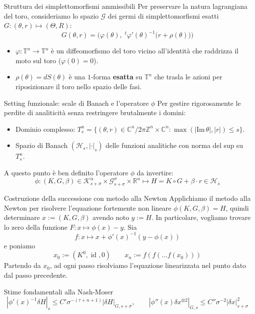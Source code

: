 \documentclass[10pt,aspectratio=169]{beamer}
\newcommand{\T}{\mathbb{T}}
\newcommand{\R}{\mathbb{R}}
\newcommand{\C}{\mathbb{C}}
\newcommand{\Z}{\mathbb{Z}}
\begin{document}
\begin{frame}{Struttura dei simplettomorfismi ammissibili}
  Per preservare la natura lagrangiana del toro, consideriamo lo spazio $\mathcal{G}$ dei germi di simplettomorfismi esatti $G: (\theta, r) \mapsto (\Theta, R)$:
  \[
    G(\theta, r) = \Big(\varphi(\theta), \; {}^t\varphi'(\theta)^{-1}\big(r + \rho(\theta)\big)\Big)
  \]
  \begin{itemize}
    \item $\varphi : \T^n \to \T^n$ è un diffeomorfismo del toro vicino all'identità che raddrizza il moto sul toro ($\varphi(0) = 0$).
    \item $\rho(\theta) = dS(\theta)$ è una $1$-forma \textbf{esatta} su $\T^n$ che trasla le azioni per riposizionare il toro nello spazio delle fasi.
  \end{itemize}
\end{frame}

\begin{frame}{Setting funzionale: scale di Banach e l'operatore $\phi$}
  Per gestire rigorosamente le perdite di analiticità senza restringere brutalmente i domini:
  \begin{itemize}
    \item Dominio complesso: $T^n_s = \{(\theta, r) \in \C^n/2\pi\Z^n \times \C^n : \max(|\mathrm{Im}\,\theta|, |r|) \le s\}$.
    \item Spazio di Banach $(\mathcal{H}_s, |\cdot|_s)$ delle funzioni analitiche con norma del sup su $T^n_s$.
  \end{itemize}
A questo punto è ben definito l'operatore $\phi$ da invertire:
    \[
      \phi : (K, G, \beta) \in \mathcal{K}^\alpha_{s+\sigma} \times \mathcal{G}_{s+\sigma}^\sigma \times \R^n \longmapsto H = K \circ G + \beta \cdot r \in \mathcal{H}_s
    \]
\end{frame}

\begin{frame}{Costruzione della successione con metodo alla Newton}
  Applichiamo il metodo alla Newton per risolvere l'equazione fortemente non lineare $\phi(K, G, \beta) = H$, quindi determinare $x := (K, G, \beta)$ avendo noto $y := H$. In particolare, vogliamo trovare lo zero della funzione $F : x \mapsto \phi(x) - y$. Sia
  \[
    f : x \mapsto x + \phi'(x)^{-1}(y - \phi(x))
  \]
  e poniamo
  \[
    x_0 := (K^0, \operatorname{id}, 0) \qquad x_n := f(f(\dots f(x_0)))
  \]
  Partendo da $x_0$, ad ogni passo risolviamo l'equazione linearizzata nel punto dato dal passo precedente.
  \begin{alertblock}{Stime fondamentali alla Nash-Moser}
    \[
      |\phi'(x)^{-1}\delta H|_s \le C' \sigma^{-(\tau+n+1)} |\delta H|_{G, s+\sigma}, \qquad |\phi''(x)\delta x^{\otimes 2}|_{G, s} \le C'' \sigma^{-2} |\delta x|_{s+\sigma}^2
    \]
  \end{alertblock}
\end{frame}
\end{document}
